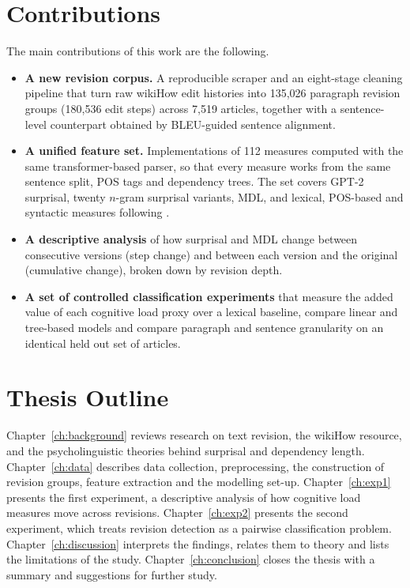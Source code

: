 \documentclass[12pt,a4paper,oneside]{report}
\begin{document}
\section{Contributions}
The main contributions of this work are the following.
\begin{itemize}
  \item \textbf{A new revision corpus.} A reproducible scraper and an eight-stage cleaning pipeline that turn raw wikiHow edit histories into 135{,}026 paragraph revision groups (180{,}536 edit steps) across 7{,}519 articles, together with a sentence-level counterpart obtained by BLEU-guided sentence alignment.
  \item \textbf{A unified feature set.} Implementations of 112 measures computed with the same transformer-based parser, so that every measure works from the same sentence split, POS tags and dependency trees. The set covers GPT-2 surprisal, twenty $n$-gram surprisal variants, MDL, and lexical, POS-based and syntactic measures following \citet{kazmi2022}.
  \item \textbf{A descriptive analysis} of how surprisal and MDL change between consecutive versions (step change) and between each version and the original (cumulative change), broken down by revision depth.
\item \textbf{A set of controlled classification experiments} that measure the added value of each cognitive load proxy over a lexical baseline, compare linear and tree-based models and compare paragraph and sentence granularity on an identical held out set of articles.
\end{itemize}

\section{Thesis Outline}
Chapter~\ref{ch:background} reviews research on text revision, the wikiHow resource, and the psycholinguistic theories behind surprisal and dependency length. Chapter~\ref{ch:data} describes data collection, preprocessing, the construction of revision groups, feature extraction and the modelling set-up. Chapter~\ref{ch:exp1} presents the first experiment, a descriptive analysis of how cognitive load measures move across revisions. Chapter~\ref{ch:exp2} presents the second experiment, which treats revision detection as a pairwise classification problem. Chapter~\ref{ch:discussion} interprets the findings, relates them to theory and lists the limitations of the study. Chapter~\ref{ch:conclusion} closes the thesis with a summary and suggestions for further study.
\end{document}
